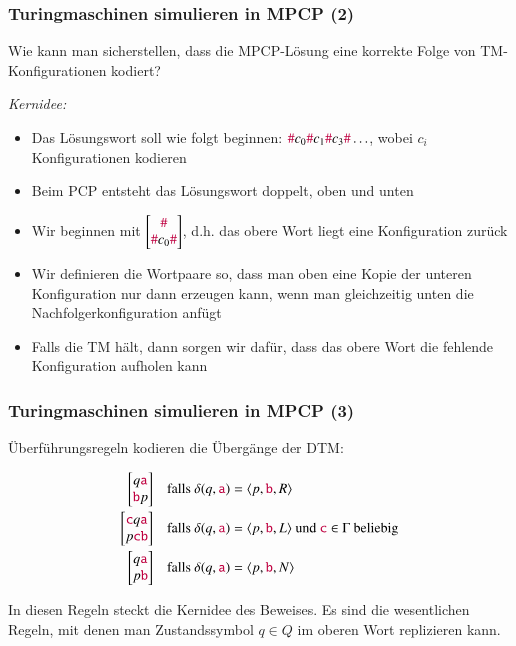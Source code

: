\documentclass[aspectratio=1610,onlymath]{beamer}
\begin{document}
\begin{frame}\frametitle{Turingmaschinen simulieren in MPCP (2)}

Wie kann man sicherstellen, dass die MPCP-Lösung eine korrekte Folge von TM-Konfigurationen kodiert?\bigskip\pause

\emph{Kernidee:}
\begin{itemize}
\item Das Lösungswort soll wie folgt beginnen: $\mathtt{\textcolor{purple}{\#}}c_0\mathtt{\textcolor{purple}{\#}}c_1\mathtt{\textcolor{purple}{\#}}c_3\mathtt{\textcolor{purple}{\#}}\ldots$, wobei $c_i$ Konfigurationen kodieren
\item Beim PCP entsteht das Lösungswort doppelt, oben und unten
\item Wir beginnen mit $\left[\begin{matrix}\mathtt{\textcolor{purple}{\#}}\\\mathtt{\textcolor{purple}{\#}}c_0\mathtt{\textcolor{purple}{\#}}\end{matrix}\right]$, d.h. das obere Wort liegt eine Konfiguration zurück
\item Wir definieren die Wortpaare so, dass man oben eine Kopie der unteren Konfiguration nur dann erzeugen kann, wenn man gleichzeitig unten die Nachfolgerkonfiguration anfügt
\item Falls die TM hält, dann sorgen wir dafür, dass das obere Wort die fehlende Konfiguration aufholen kann
\end{itemize}

\end{frame}

\begin{frame}\frametitle{Turingmaschinen simulieren in MPCP (3)}

\alert{Überführungsregeln} kodieren die Übergänge der DTM:

\begin{align*}
\left[\begin{matrix}q\mathtt{\textcolor{purple}{a}}\\\mathtt{\textcolor{purple}{b}}p\end{matrix}\right]\quad
	& \text{falls $\delta(q,\mathtt{\textcolor{purple}{a}})=\langle{p,\ensuremath{\mathtt{\textcolor{purple}{b}}},R}\rangle$}\\
\left[\begin{matrix}\mathtt{\textcolor{purple}{c}}q\mathtt{\textcolor{purple}{a}}\\p\mathtt{\textcolor{purple}{cb}}\end{matrix}\right]\quad
	& \text{falls $\delta(q,\mathtt{\textcolor{purple}{a}})=\langle{p,\ensuremath{\mathtt{\textcolor{purple}{b}}},L}\rangle$ und $\mathtt{\textcolor{purple}{c}}\in\Gamma$ beliebig}\\
\left[\begin{matrix}q\mathtt{\textcolor{purple}{a}}\\p\mathtt{\textcolor{purple}{b}}\end{matrix}\right]\quad
	& \text{falls $\delta(q,\mathtt{\textcolor{purple}{a}})=\langle{p,\ensuremath{\mathtt{\textcolor{purple}{b}}},N}\rangle$}
\end{align*}

In diesen Regeln steckt die Kernidee des Beweises. Es sind die wesentlichen Regeln, mit denen man Zustandssymbol $q\in Q$ im oberen Wort replizieren kann.

\end{frame}
\end{document}
